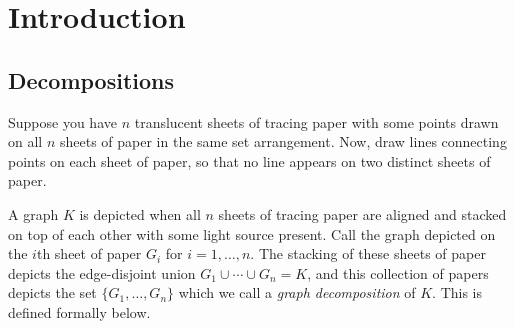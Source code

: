 \chapter{Introduction} \label{chap:intro}
\label{intro_chapter}
\section{Decompositions}
Suppose you have $n$ translucent sheets of tracing paper with some points drawn on all $n$ sheets of paper in the same set arrangement. Now, draw lines connecting points on each sheet of paper, so that no line appears on two distinct sheets of paper.

A graph $K$ is depicted when all $n$ sheets of tracing paper are aligned and stacked on top of each other with some light source present. Call the graph depicted on the $i$th sheet of paper $G_{i}$ for $i=1,\hdots,n$. The stacking of these sheets of paper depicts the edge-disjoint union $G_{1}\cup \cdots \cup G_{n}=K$, and this collection of papers depicts the set $\{G_{1},\hdots,G_{n}\}$ which we call a \textit{graph decomposition} of $K$. This is defined formally below.

